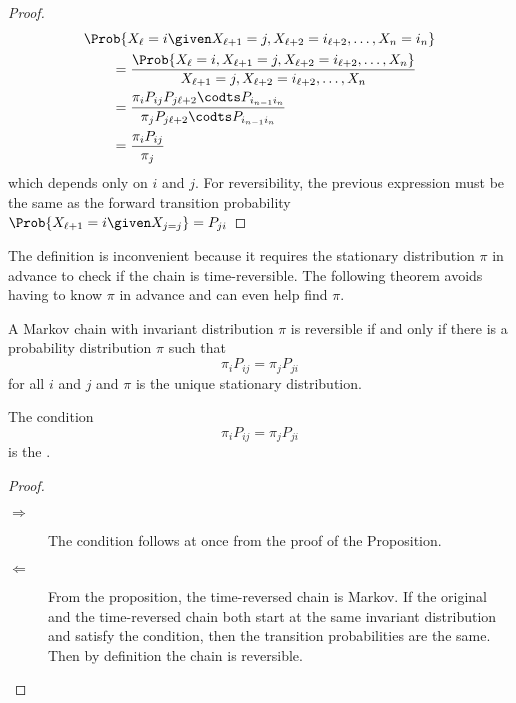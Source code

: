 \documentclass[12pt]{article}
\begin{document}
\begin{proof}
  \begin{align*}
    & \Prob{X_\ell = i \given X_{\ell+1} = j, X_{\ell+2} = i_{\ell+2}, \dots, X_n
      = i_n} \\
    &\qquad = \frac{\Prob{X_\ell = i,   X_{\ell+1} = j, X_{\ell+2} = i_{\ell+2},
      \dots, X_n}}{X_{\ell+1} = j, X_{\ell+2} = i_{\ell+2}, \dots, X_n} \\
    &\qquad = \frac{\pi_i P_{ij}P_{j \ell+2}\codts P_{i_{n-1} i_n}}{\pi_j
      P_{j \ell+2}\codts P_{i_{n-1} i_n}} \\
    &\qquad = \frac{\pi_i P_{ij}}{\pi_j}
  \end{align*}
  which depends only on $i$ and $j$.
 For reversibility, the previous expression must be the same as
  the forward transition probability $\Prob{X_{\ell+1} = i \given X_{j =
      j}} = P_{ji}$
\end{proof}

\begin{remark}
  The definition is inconvenient because it requires the
stationary distribution $\pi$ in advance  to check if the chain is time-reversible.  The
following theorem  avoids having to know $\pi$ in advance and can even
help find $\pi$.

\end{remark}
\begin{theorem}
  A Markov chain with invariant distribution $\pi$ is reversible if
  and only if there is a probability distribution $\pi$ such that
  \[
    \pi_i P_{ij} = \pi_j P_{ji}
  \]
  for all $i$ and $j$ and $\pi$ is the unique stationary distribution.
\end{theorem}

\begin{remark}
  The condition
  \[
    \pi_i P_{ij} = \pi_j P_{ji}
  \]
  is the .
\end{remark}

\begin{proof}
  \begin{description}
  \item[$\Rightarrow$] The condition follows at once from the
    proof of the Proposition.
  \item[$\Leftarrow$] From the proposition, the time-reversed chain is
    Markov.  If the original and the time-reversed chain both
    start at the same invariant distribution and satisfy the
    condition, then the transition probabilities are the same.  Then
    by definition the chain is reversible. 
  \end{description}
\end{proof}
\end{document}

